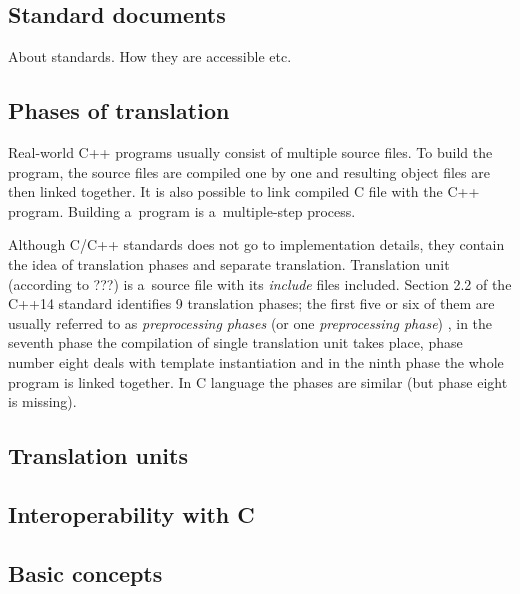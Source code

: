 \documentclass{fithesis3}
\begin{document}

\subsection{Standard documents}

About standards. How they are accessible etc.

\subsection{Phases of translation}
\label{txt:phases-of-translation}
Real-world C++ programs usually consist of multiple source files. To build the program, the source files are compiled one by one and resulting object files are then linked together. It is also possible to link compiled C file with the C++ program. Building a~program is a~multiple-step process.


Although C/C++ standards does not go to implementation details, they contain the idea of translation phases and separate translation. Translation unit (according to ???) is a~source file with its \textit{include} files included. Section 2.2 of the C++14 standard identifies 9 translation phases; the first five or six of them are usually referred to as \textit{preprocessing phases} (or one \textit{preprocessing phase}) , in the seventh phase the compilation of single translation unit takes place, phase number eight deals with template instantiation and in the ninth phase the whole program is linked together. In C language the phases are similar (but phase eight is missing).

\subsection{Translation units}

\subsection{Interoperability with C}

\subsection{Basic concepts}

\end{document}
